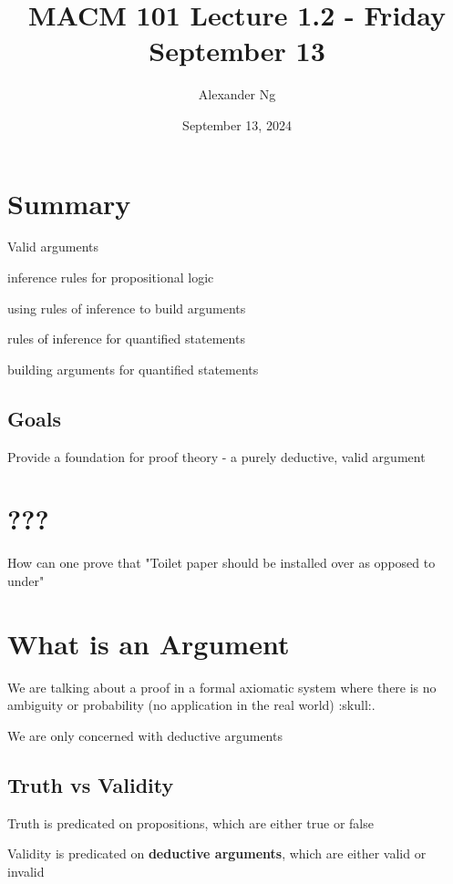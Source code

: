 \documentclass[12pt]{article}
\begin{document}
\title{MACM 101 Lecture 1.2 - Friday September 13}
\author{Alexander Ng}
\date{September 13, 2024}

\maketitle

\section{Summary}

Valid arguments

inference rules for propositional logic

using rules of inference to build arguments

rules of inference for quantified statements

building arguments for quantified statements

\subsection{Goals}

Provide a foundation for proof theory - a purely deductive, valid argument

\section{???}

How can one prove that "Toilet paper should be installed over as opposed to
under"

\section{What is an Argument}

We are talking about a proof in a formal axiomatic system where there is no
ambiguity or probability (no application in the real world) :skull:.

We are only concerned with deductive arguments

\subsection{Truth vs Validity} %

Truth is predicated on propositions, which are either true or false

Validity is predicated on \textbf{deductive arguments}, which are either valid or invalid
\end{document}
